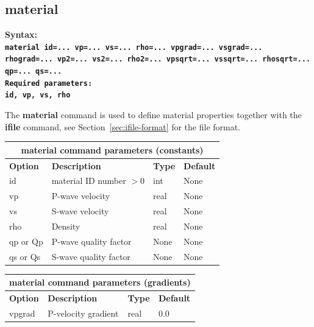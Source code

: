 \documentclass[11pt]{report}
\begin{document}
{\subsection{material}
\label{keyword:material}
\begin{flushleft}\bf
	Syntax:\\
	\tt material
	id=... vp=... vs=... rho=... vpgrad=... vsgrad=... rhograd=... vp2=... vs2=... rho2=... vpsqrt=... vssqrt=... rhosqrt=... qp=... qs=...\\
	\bf Required parameters:\\
	\tt id, vp, vs, rho
\end{flushleft}
The {\bf material} command is used to define material properties together with the {\bf ifile}
command, see Section~\ref{sec:ifile-format} for the file format.
\begin{center}
	\begin{tabular}{|l|p{8cm}|l|l|} \hline
		\multicolumn{4}{|c|}{\bf material command parameters (constants)} \\ \hline
		\bf{Option} & \bf{Description}        & \bf{Type} & \bf{Default}  \\ \hline \hline
		id          & material ID number $>0$ & int       & None          \\ \hline
		vp          & P-wave velocity         & real      & None          \\ \hline
		vs          & S-wave velocity         & real      & None          \\ \hline
		rho         & Density                 & real      & None          \\ \hline
		qp or Qp    & P-wave quality factor   & None      & None          \\ \hline
		qs or Qs    & S-wave quality factor   & None      & None          \\ \hline
	\end{tabular}
\end{center}
\begin{center}
	\begin{tabular}{|l|p{8cm}|l|l|} \hline
		\multicolumn{4}{|c|}{\bf material command parameters (gradients)} \\ \hline
		\bf{Option} & \bf{Description}    & \bf{Type} & \bf{Default}      \\ \hline \hline
		vpgrad      & P-velocity gradient & real      & 0.0               \\ \hline

\end{tabular}
\end{center}}
\end{document}
